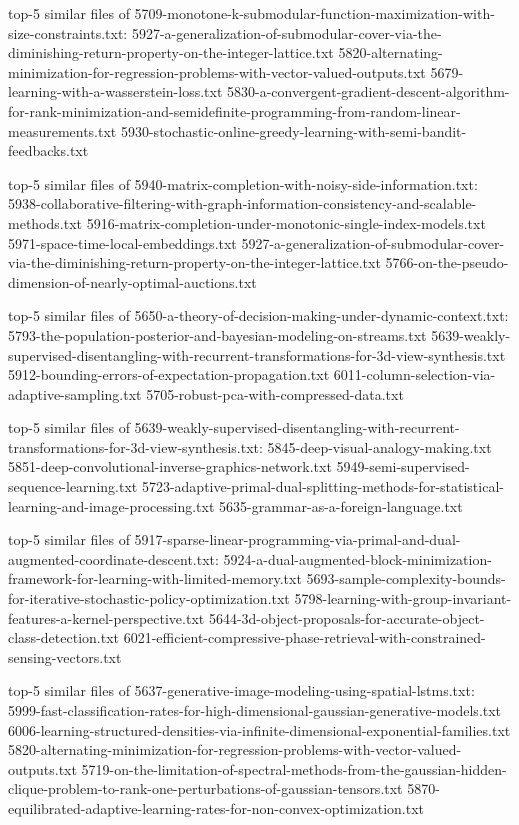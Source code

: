\documentclass[11pt]{article}
\begin{document}
top-5 similar files of
5709-monotone-k-submodular-function-maximization-with-size-constraints.txt:
5927-a-generalization-of-submodular-cover-via-the-diminishing-return-property-on-the-integer-lattice.txt
5820-alternating-minimization-for-regression-problems-with-vector-valued-outputs.txt
5679-learning-with-a-wasserstein-loss.txt
5830-a-convergent-gradient-descent-algorithm-for-rank-minimization-and-semidefinite-programming-from-random-linear-measurements.txt
5930-stochastic-online-greedy-learning-with-semi-bandit-feedbacks.txt

top-5 similar files of
5940-matrix-completion-with-noisy-side-information.txt:
5938-collaborative-filtering-with-graph-information-consistency-and-scalable-methods.txt
5916-matrix-completion-under-monotonic-single-index-models.txt
5971-space-time-local-embeddings.txt
5927-a-generalization-of-submodular-cover-via-the-diminishing-return-property-on-the-integer-lattice.txt
5766-on-the-pseudo-dimension-of-nearly-optimal-auctions.txt

top-5 similar files of
5650-a-theory-of-decision-making-under-dynamic-context.txt:
5793-the-population-posterior-and-bayesian-modeling-on-streams.txt
5639-weakly-supervised-disentangling-with-recurrent-transformations-for-3d-view-synthesis.txt
5912-bounding-errors-of-expectation-propagation.txt
6011-column-selection-via-adaptive-sampling.txt
5705-robust-pca-with-compressed-data.txt

top-5 similar files of
5639-weakly-supervised-disentangling-with-recurrent-transformations-for-3d-view-synthesis.txt:
5845-deep-visual-analogy-making.txt
5851-deep-convolutional-inverse-graphics-network.txt
5949-semi-supervised-sequence-learning.txt
5723-adaptive-primal-dual-splitting-methods-for-statistical-learning-and-image-processing.txt
5635-grammar-as-a-foreign-language.txt

top-5 similar files of
5917-sparse-linear-programming-via-primal-and-dual-augmented-coordinate-descent.txt:
5924-a-dual-augmented-block-minimization-framework-for-learning-with-limited-memory.txt
5693-sample-complexity-bounds-for-iterative-stochastic-policy-optimization.txt
5798-learning-with-group-invariant-features-a-kernel-perspective.txt
5644-3d-object-proposals-for-accurate-object-class-detection.txt
6021-efficient-compressive-phase-retrieval-with-constrained-sensing-vectors.txt

top-5 similar files of
5637-generative-image-modeling-using-spatial-lstms.txt:
5999-fast-classification-rates-for-high-dimensional-gaussian-generative-models.txt
6006-learning-structured-densities-via-infinite-dimensional-exponential-families.txt
5820-alternating-minimization-for-regression-problems-with-vector-valued-outputs.txt
5719-on-the-limitation-of-spectral-methods-from-the-gaussian-hidden-clique-problem-to-rank-one-perturbations-of-gaussian-tensors.txt
5870-equilibrated-adaptive-learning-rates-for-non-convex-optimization.txt
\end{document}
